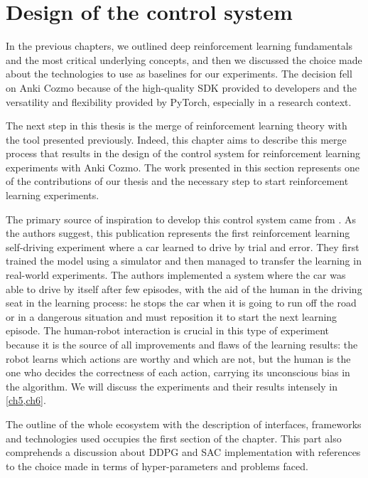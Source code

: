 \chapter{Design of the control system} \label{ch4}

In the previous chapters, we outlined deep reinforcement learning fundamentals and the most critical underlying concepts, and then we discussed the choice made about the technologies to use as baselines for our experiments. The decision fell on Anki Cozmo because of the high-quality SDK provided to developers and the versatility and flexibility provided by PyTorch, especially in a research context.

The next step in this thesis is the merge of reinforcement learning theory with the tool presented previously. Indeed, this chapter aims to describe this merge process that results in the design of the control system for reinforcement learning experiments with Anki Cozmo. The work presented in this section represents one of the contributions of our thesis and the necessary step to start reinforcement learning experiments.

The primary source of inspiration to develop this control system came from \cite{kendall2018learning,kendall2019learning}. As the authors suggest, this publication represents the first reinforcement learning self-driving experiment where a car learned to drive by trial and error. They first trained the model using a simulator and then managed to transfer the learning in real-world experiments. The authors implemented a system where the car was able to drive by itself after few episodes, with the aid of the human in the driving seat in the learning process: he stops the car when it is going to run off the road or in a dangerous situation and must reposition it to start the next learning episode.
The human-robot interaction is crucial in this type of experiment because it is the source of all improvements and flaws of the learning results: the robot learns which actions are worthy and which are not, but the human is the one who decides the correctness of each action, carrying its unconscious bias in the algorithm. We will discuss the experiments and their results intensely in \vref{ch5,ch6}.

The outline of the whole ecosystem with the description of interfaces, frameworks and technologies used occupies the first section of the chapter. This part also comprehends a discussion about DDPG \cite{lillicrap2015continuous} and SAC \cite{haarnoja2018soft, haarnoja2018alg} implementation with references to the choice made in terms of hyper-parameters and problems faced.

